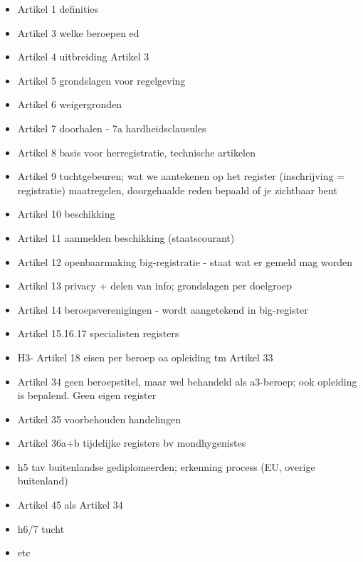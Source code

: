 \begin{itemize}
    \item Artikel 1 definities 
    \item Artikel 3 welke beroepen ed
    \item Artikel 4 uitbreiding Artikel 3
    \item Artikel 5 grondslagen voor regelgeving
    \item Artikel 6 weigergronden
    \item Artikel 7 doorhalen - 7a hardheidsclausules
    \item Artikel 8 basis voor herregistratie, technische artikelen
    \item Artikel 9 tuchtgebeuren; wat we aantekenen op het register (inschrijving = registratie) maatregelen, doorgehaalde reden bepaald of je zichtbaar bent 
    \item Artikel 10 beschikking
    \item Artikel 11 aanmelden beschikking (staatscourant)
    \item Artikel 12 openbaarmaking big-registratie - staat wat er gemeld mag worden
    \item Artikel 13 privacy + delen van info; grondslagen per doelgroep
    \item Artikel 14 beroepsverenigingen - wordt aangetekend in big-register
    \item Artikel 15.16.17 specialisten registers
    \item H3- Artikel 18 eisen per beroep oa opleiding tm Artikel 33
    \item Artikel 34 geen beroepstitel, maar wel behandeld als a3-beroep; ook opleiding is bepalend. Geen eigen register
    \item Artikel 35 voorbehouden handelingen
    \item Artikel 36a+b tijdelijke registers bv mondhygenistes
    \item h5 tav buitenlandse gediplomeerden; erkenning process (EU, overige buitenland)
    \item Artikel 45 als Artikel 34
    \item h6/7 tucht
    \item etc
\end{itemize}
